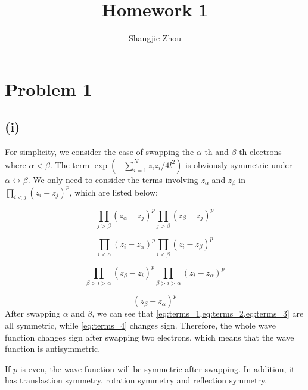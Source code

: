 \documentclass{article}
\title{Homework 1}
\author{Shangjie Zhou}
\begin{document}
\maketitle


\section*{Problem 1}
\subsection*{(i)}
For simplicity, we consider the case of swapping the $\alpha$-th and $\beta$-th electrons where $\alpha<\beta$.
The term $\exp(-\sum_{i=1}^Nz_i \bar{z}_i/4l^2)$ is obviously symmetric under $\alpha\leftrightarrow \beta$.
We only need to consider the terms involving $z_\alpha$ and $z_\beta$ in $\prod_{i<j}(z_i-z_j)^p$, which are listed below:

\begin{equation}\label{eq:terms_1}
    \prod_{j>\beta}(z_\alpha-z_j)^p\prod_{j>\beta}(z_\beta-z_j)^p
\end{equation}


\begin{equation}\label{eq:terms_2}
    \prod_{i<\alpha}(z_i-z_\alpha)^p\prod_{i<\beta}(z_i-z_\beta)^p
\end{equation}

\begin{equation}\label{eq:terms_3}
    \prod_{\beta>i>\alpha}(z_\beta-z_i)^p\prod_{\beta>i>\alpha}(z_i-z_\alpha)^p
\end{equation}

\begin{equation}\label{eq:terms_4}
    (z_\beta-z_\alpha)^p
\end{equation}
After swapping $\alpha$ and $\beta$, we can see that \cref{eq:terms_1,eq:terms_2,eq:terms_3} are all symmetric, while \cref{eq:terms_4} changes sign.
Therefore, the whole wave function changes sign after swapping two electrons, which means that the wave function is antisymmetric.

If $p$ is even, the wave function will be symmetric after swapping.
In addition, it has translastion symmetry, rotation symmetry and reflection symmetry.
\end{document}
